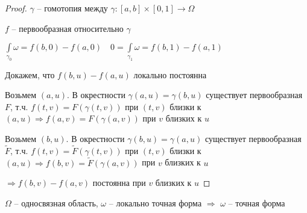\begin{proof}\thmslashn
	
	$\gamma$ -- гомотопия между $\gamma : [a, b]\times [0, 1] \to \Omega$
	
	$f$ -- первообразная относительно $\gamma$ 
	
	$\int\limits_{\gamma_0} \omega = f(b, 0) - f(a, 0) \quad 0 =  \int\limits_{\gamma_1} \omega = f(b, 1) - f(a, 1)$
	
	Докажем, что $f(b, u) - f(a, u)$ локально постоянна
	
	Возьмем $(a, u)$. В окрестности $\gamma(a, u) = \gamma(b, u)$ существует первообразная $F$, т.ч. $f(t, v) = F(\gamma(t, v))$ при $(t, v)$ близки к $(a, u) \Rightarrow f(a,v) = F(\gamma(a, v))$ при $v$ близких к $u$ 
	
	Возьмем $(b, u)$. В окрестности $\gamma(b, u) = \gamma(a, u)$ существует первообразная $\tilde{F}$, т.ч. $f(t, v) = \tilde{F}(\gamma(t, v))$ при $(t, v)$ близки к $(a, u) \Rightarrow f(b,v) = \tilde{F}(\gamma(a, v))$ при $v$ близких к $u$ 
	
	$\Rightarrow f(b, v) - f(a, v)$ постоянна при $v$ близких к $u$
	
\end{proof}

\begin{theorem}\thmslashn
	
	$\Omega$ -- односвязная область, $\omega$ -- локально точная форма $\Rightarrow$ $\omega$ -- точная форма
	
\end{theorem}